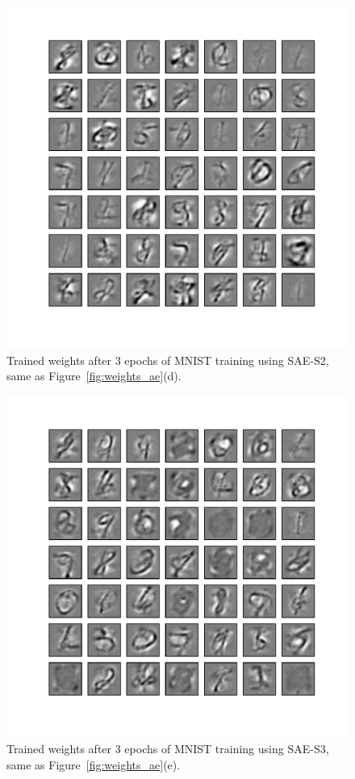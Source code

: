 \begin{figure}
	\centering
	\includegraphics[width=\textwidth]{pics_sdlm/42_MNIST_SAE_noise/2_60000_0.pdf}
	\caption[Trained weights of SAE-S2, same as Figure~\ref{fig:weights_ae}(d).]{Trained weights after 3 epochs of MNIST training using SAE-S2, same as Figure~\ref{fig:weights_ae}(d).}
	\label{fig:weights_ae4}
\end{figure}

\begin{figure}
	\centering
	\includegraphics[width=\textwidth]{pics_sdlm/41_MNIST_SAE_teach/2_60000_0.pdf}
	\caption[Trained weights of SAE-S3, same as Figure~\ref{fig:weights_ae}(e).]{Trained weights after 3 epochs of MNIST training using SAE-S3, same as Figure~\ref{fig:weights_ae}(e).}
	\label{fig:weights_ae5}
\end{figure}

